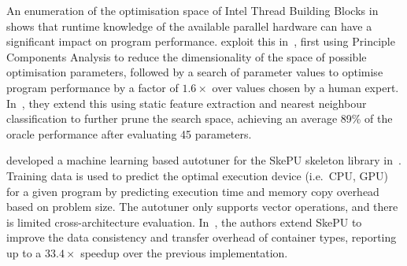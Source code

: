 \documentclass[nonatbib,preprint,9pt]{sigplanconf}
\begin{document}





An enumeration of the optimisation space of Intel Thread Building
Blocks in~\cite{Contreras2008} shows that runtime knowledge of the
available parallel hardware can have a significant impact on program
performance. \citeauthor{Collins2012} exploit this
in~\cite{Collins2012}, first using Principle Components Analysis to
reduce the dimensionality of the space of possible optimisation
parameters, followed by a search of parameter values to optimise
program performance by a factor of $1.6\times$ over values chosen by a
human expert. In~\cite{Collins2013}, they extend this using static
feature extraction and nearest neighbour classification to further
prune the search space, achieving an average 89\% of the oracle
performance after evaluating 45 parameters.

\citeauthor{Dastgeer2011} developed a machine learning based autotuner
for the SkePU skeleton library in~\cite{Dastgeer2011}. Training data
is used to predict the optimal execution device (i.e.\ CPU, GPU) for a
given program by predicting execution time and memory copy overhead
based on problem size. The autotuner only supports vector operations,
and there is limited cross-architecture
evaluation. In~\cite{Dastgeer2015a}, the authors extend SkePU to
improve the data consistency and transfer overhead of container types,
reporting up to a $33.4\times$ speedup over the previous
implementation.
\end{document}
